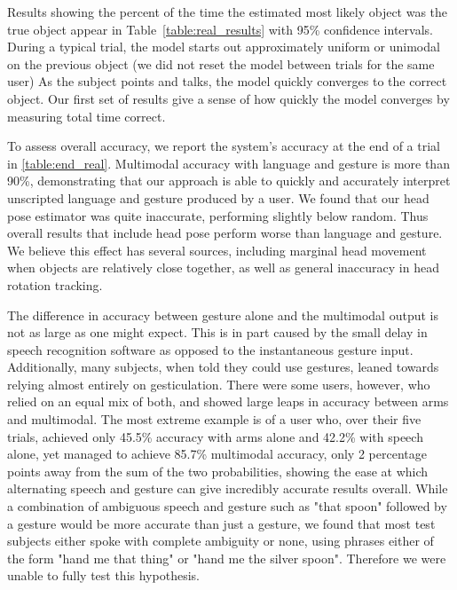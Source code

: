 \documentclass[a4paper, 11pt]{article} %
\begin{document}
Results showing the percent of the time the estimated most likely
object was the true object appear in Table~\ref{table:real_results}
with 95\% confidence intervals.  During a typical trial, the model
starts out approximately uniform or unimodal on the previous object
(we did not reset the model between trials for the same user) As the subject points and
talks, the model quickly converges to the correct object.  Our first
set of results give a sense of how quickly the model converges by measuring total time correct.

To assess overall accuracy, we report the system's accuracy at the end
of a trial in \ref{table:end_real}.  Multimodal accuracy with language
and gesture is more than 90\%, demonstrating that our approach is able
to quickly and accurately interpret unscripted language and gesture
produced by a user.  We found that our head pose estimator was quite
inaccurate, performing slightly below random.  Thus overall
results that include head pose perform worse than language and
gesture.  We believe this effect has several sources, including marginal head movement when objects are relatively close together, as well as general inaccuracy in head rotation tracking. 

The difference in accuracy between gesture alone and the multimodal output is not as large as one might expect. This is in part caused by the small delay in speech recognition software as opposed to the instantaneous gesture input. Additionally, many subjects, when told they could use gestures, leaned towards relying almost entirely on gesticulation. There were some users, however, who relied on an equal mix of both, and showed large leaps in accuracy between arms and multimodal. The most extreme example is of a user who, over their five trials, achieved only 45.5\% accuracy with arms alone and 42.2\% with speech alone, yet managed to achieve 85.7\% multimodal accuracy, only 2 percentage points away from the sum of the two probabilities, showing the ease at which alternating speech and gesture can give incredibly accurate results overall. While a combination of ambiguous speech and gesture such as "that spoon" followed by a gesture would be more accurate than just a gesture, we found that most test subjects either spoke with complete ambiguity or none, using phrases either of the form "hand me that thing" or "hand me the silver spoon". Therefore we were unable to fully test this hypothesis.
\end{document}
